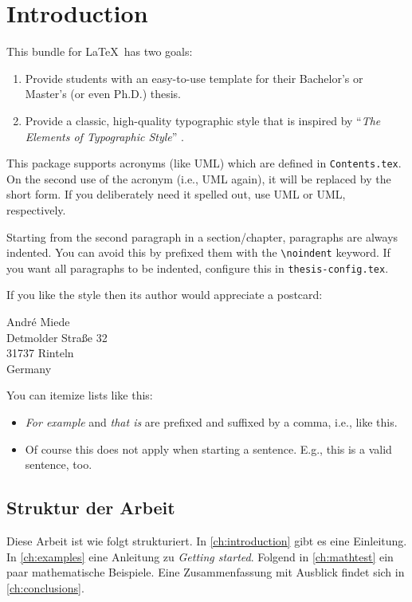 \chapter{Introduction}\label{ch:introduction}

This bundle for \LaTeX\ has two goals:
\begin{enumerate}
    \item Provide students with an easy-to-use template for their
    Bachelor's or Master's (or even Ph.D.) thesis. 
    \item Provide a classic, high-quality typographic style that is
    inspired by ``\emph{The Elements of
    Typographic Style}'' \cite{bringhurst:2002}.
\end{enumerate}

\bigskip

This package supports acronyms (like \ac{UML}) which are defined in \texttt{Contents.tex}.
On the second use of the acronym (i.e., \ac{UML} again), it will be replaced by the short form.
If you deliberately need it spelled out, use \acl{UML} or \acf{UML}, respectively.

\bigskip

Starting from the second paragraph in a section/chapter, paragraphs are always indented.
You can avoid this by prefixed them with the \texttt{\textbackslash noindent} keyword.
If you want all paragraphs to be indented, configure this in \texttt{thesis-config.tex}.

\bigskip

\noindent If you like the style then its author would appreciate a postcard:
\begin{center}
 André Miede \\
 Detmolder Straße 32 \\
 31737 Rinteln \\
 Germany
\end{center}

You can itemize lists like this:
\begin{itemize}
\item \emph{For example} and \emph{that is} are prefixed and suffixed by a comma, i.e., like this. 
\item Of course this does not apply when starting a sentence. E.g., this is a valid sentence, too.
\end{itemize}

\section{Struktur der Arbeit}
Diese Arbeit ist wie folgt strukturiert.
In \autoref{ch:introduction} gibt es eine Einleitung.
In \autoref{ch:examples} eine Anleitung zu \emph{Getting started}.
Folgend in \autoref{ch:mathtest} ein paar mathematische Beispiele.
Eine Zusammenfassung mit Ausblick findet sich in \autoref{ch:conclusions}.


